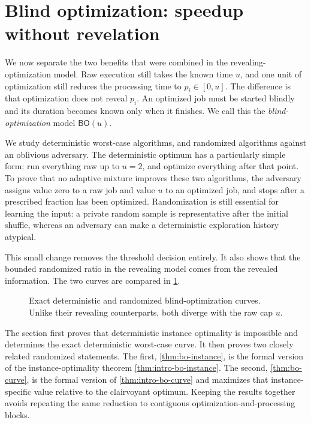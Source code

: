 \section{Blind optimization: speedup without revelation}
\label{sec:blind-optimization}

We now separate the two benefits that were combined in the
revealing-optimization model.  Raw execution still takes the known time $u$, and one
unit of optimization still reduces the processing time to $p_i\in[0,u]$.
The difference is that optimization does not reveal $p_i$.  An optimized job
must be started blindly and its duration becomes known only when it finishes.
We call this the \emph{blind-optimization} model $\mathsf{BO}(u)$.

We study deterministic worst-case algorithms, and randomized algorithms against
an oblivious adversary.  The deterministic optimum has a particularly
simple form: run everything raw up to $u=2$, and optimize everything after
that point.  To prove that no adaptive mixture improves these two algorithms,
the adversary assigns value zero to a raw job and value $u$ to an optimized
job, and stops after a prescribed fraction has been optimized.  Randomization
is still essential for learning the input:
a private random sample is representative after the initial shuffle,
whereas an adversary can make a deterministic exploration history atypical.

This small change removes the threshold decision entirely.  It also shows
that the bounded randomized ratio in the revealing model comes from the
revealed information.  The two curves are compared in
\cref{fig:blind-optimization-curves}.

\begin{figure}[htbp]
\centering

\caption{Exact deterministic and randomized blind-optimization curves.
Unlike their revealing counterparts, both diverge with the raw cap $u$.}
\label{fig:blind-optimization-curves}
\end{figure}

The section first proves that deterministic instance optimality is impossible
and determines the exact deterministic worst-case curve.  It then proves two
closely related randomized statements.  The first, \cref{thm:bo-instance},
is the formal version of the instance-optimality theorem
\cref{thm:intro-bo-instance}.  The second, \cref{thm:bo-curve}, is the
formal version of \cref{thm:intro-bo-curve} and maximizes that
instance-specific value relative to the clairvoyant optimum.  Keeping the
results together avoids repeating the same reduction to contiguous
optimization-and-processing blocks.

